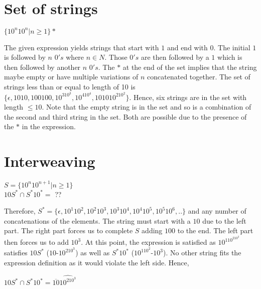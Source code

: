 \documentclass[11pt,letterpaper]{article}
\begin{document}
\section{Set of strings}
\begin{center} $\{10^n10^n | n \geq 1\}*$ \end{center}
The given expression yields strings that start with $1$ and end with $0$. The initial $1$ is followed by $n$ $0's$ where $n \in N$. Those $0's$ are then followed by a $1$ which is then followed by another $n$ $0's$. The $*$ at the end of the set implies that the string maybe empty or have multiple variations of $n$ concatenated together.
The set of strings less than or equal to length of 10 is $\{\epsilon, 1010, 100100, 10^310^3, 10^410^4, 101010^210^2\}$. Hence, six strings are in the set with length $\leq 10$. Note that the empty string is in the set and so is a combination of the second and third string in the set. Both are possible due to the presence of the $*$ in the expression.

\section{Interweaving}
\begin{center}
    $S = \{10^{n}10^{n+1}|n \geq 1\}$
    \\
    $10S^{*} \cap S^{*}10^{*} =$ ??
\end{center}
Therefore, $S^{*} = \{\epsilon, 10^{1}10^{2}, 10^{2}10^{3}, 10^{3}10^{4}, 10^{4}10^{5}, 10^{5}10^{6}, ..\}$ and any number of concatenations of the elements.
The string must start with a $10$ due to the left part. The right part forces us to complete $S$ adding $100$ to the end. The left part then forces us to add $10^{3}$. At this point, the expression is satisfied as $10^110^210^3$ satisfies $10S^*$ ($10$-$10^210^3$) as well as $S^*10^*$ ($10^110^2$-$10^3$). No other string fits the expression definition as it would violate the left side. Hence,
\begin{center}
    $10S^{*} \cap S^{*}10^{*} = \overline{10}\widehat{10^210^3}$
\end{center}
\end{document}
